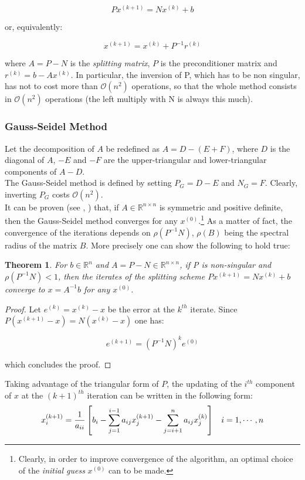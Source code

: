 \documentclass[11pt]{article}
\theoremstyle{theorem}
\newtheorem{theorem}{Theorem}
\theoremstyle{definition}
\begin{document}
$$Px^{(k+1)}=Nx^{(k)}+b$$

or, equivalently:

$$x^{(k+1)}=x^{(k)}+P^{-1}r^{(k)}$$

where $A=P-N$ is the \emph{splitting matrix}, $P$ is the preconditioner matrix and $r^{(k)}=b-Ax^{(k)}$. In particular, the inversion of
P, which has to be non singular, has not to cost more than $\mathcal{O}(n^2)$ operations, so that the whole method consists in $\mathcal{O}(n^2)$ operations  (the left multiply with N is always this much).\\

\subsubsection{Gauss-Seidel Method}
\label{subsubsec:gauss-seidel-method}
Let the decomposition of $A$ be redefined as $A=D-(E+F)$, where $D$ is the diagonal of $A$, $-E$ and $-F$ are the upper-triangular and lower-triangular components of $A-D$.\\
The Gauss-Seidel method is defined by setting $P_G=D-E$ and $N_G=F$. Clearly, inverting $P_G$ costs $\mathcal{O}(n^2)$.\\
It can be proven (see \cite{lec-notes}, \cite{hac94}) that, if $A\in\mathbb{R}^{n\times n}$ is symmetric and positive definite, then the Gauss-Seidel method converges for any $x^{(0)}$.\footnote{Clearly, in order to improve convergence of the algorithm, an optimal choice of the \emph{initial guess} $x^{(0)}$ can to be made.} As a matter of fact, the convergence of the iterations depends on $\rho(P^{-1}N)$, $\rho(B)$ being the spectral radius of the matrix $B$. More precisely one can show the following to hold true: 

\begin{theorem}
For $b\in\mathbb{R}^n$ and $A=P-N\in\mathbb{R}^{n\times n}$, if P is non-singular and $\rho(P^{-1}N)<1$, then the iterates of the splitting scheme $Px^{(k+1)}=Nx^{(k)}+b$ converge to $x=A^{-1}b$ for any $x^{(0)}$.
\end{theorem}
\begin{proof}
Let $e^{(k)}=x^{(k)}-x$ be the error at the $k^{th}$ iterate. Since $P(x^{(k+1)}-x)=N(x^{(k)}-x)$ one has:

$$e^{(k+1)}=(P^{-1}N)^ke^{(0)}$$

which concludes the proof.
\end{proof}

Taking advantage of the triangular form of $P$, the updating of the $i^{th}$ component of $x$ at the $(k+1)^{th}$ iteration can be written in the following form:
\begin{equation}
	\label{eqn:Gauss-Seidel}
	x_i^{(k+1)}=\frac{1}{a_{ii}}\left[b_i-\sum_{j=1}^{i-1}a_{ij}x_j^{(k+1)}-\sum_{j=i+1}^{n}a_{ij}x_j^{(k)}\right]\hspace{3mm} i=1,\cdots, n
\end{equation}
\end{document}
